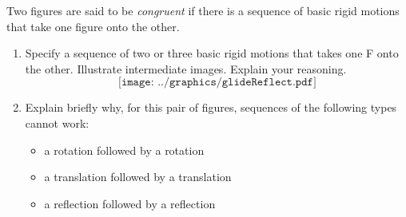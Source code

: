 \newpage
\begin{prob}
Two figures are said to be \emph{congruent} if there is a sequence of basic rigid motions that take one figure onto the other.  
\begin{enumerate}
\item Specify a sequence of two or three basic rigid motions that takes one F onto the other.  Illustrate intermediate images.  Explain your reasoning.  
\vspace{1in}
$$\texttt{[image: ../graphics/glideReflect.pdf]}$$
\vspace{0.5in}
\item Explain briefly why, for this pair of figures, sequences of the following types cannot work: 
\begin{itemize}
\item a rotation followed by a rotation
\item a translation followed by a translation
\item a reflection followed by a reflection
\end{itemize}
\end{enumerate}
\end{prob}

